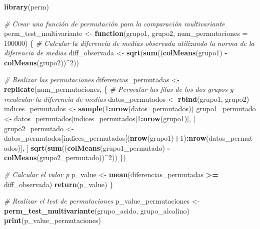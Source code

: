 \documentclass[
]{article}
\newenvironment{Shaded}{\begin{snugshade}}{\end{snugshade}}
\newcommand{\AttributeTok}[1]{\textcolor[rgb]{0.13,0.29,0.53}{#1}}
\newcommand{\CommentTok}[1]{\textcolor[rgb]{0.56,0.35,0.01}{\textit{#1}}}
\newcommand{\ControlFlowTok}[1]{\textcolor[rgb]{0.13,0.29,0.53}{\textbf{#1}}}
\newcommand{\DecValTok}[1]{\textcolor[rgb]{0.00,0.00,0.81}{#1}}
\newcommand{\FunctionTok}[1]{\textcolor[rgb]{0.13,0.29,0.53}{\textbf{#1}}}
\newcommand{\NormalTok}[1]{#1}
\newcommand{\OtherTok}[1]{\textcolor[rgb]{0.56,0.35,0.01}{#1}}
\newcommand{\SpecialCharTok}[1]{\textcolor[rgb]{0.81,0.36,0.00}{\textbf{#1}}}
\begin{document}
\begin{Shaded}
\begin{Highlighting}[]
\FunctionTok{library}\NormalTok{(perm)}

\CommentTok{\# Crear una función de permutación para la comparación multivariante}
\NormalTok{perm\_test\_multivariante }\OtherTok{\textless{}{-}} \ControlFlowTok{function}\NormalTok{(grupo1, grupo2, }\AttributeTok{num\_permutaciones =} \DecValTok{100000}\NormalTok{) \{}
  \CommentTok{\# Calcular la diferencia de medias observada utilizando la norma de la diferencia de medias}
\NormalTok{  diff\_observada }\OtherTok{\textless{}{-}} \FunctionTok{sqrt}\NormalTok{(}\FunctionTok{sum}\NormalTok{((}\FunctionTok{colMeans}\NormalTok{(grupo1) }\SpecialCharTok{{-}} \FunctionTok{colMeans}\NormalTok{(grupo2))}\SpecialCharTok{\^{}}\DecValTok{2}\NormalTok{))}
  
  \CommentTok{\# Realizar las permutaciones}
\NormalTok{  diferencias\_permutadas }\OtherTok{\textless{}{-}} \FunctionTok{replicate}\NormalTok{(num\_permutaciones, \{}
    \CommentTok{\# Permutar las filas de los dos grupos y recalcular la diferencia de medias}
\NormalTok{    datos\_permutados }\OtherTok{\textless{}{-}} \FunctionTok{rbind}\NormalTok{(grupo1, grupo2)}
\NormalTok{    indices\_permutados }\OtherTok{\textless{}{-}} \FunctionTok{sample}\NormalTok{(}\DecValTok{1}\SpecialCharTok{:}\FunctionTok{nrow}\NormalTok{(datos\_permutados))}
\NormalTok{    grupo1\_permutado }\OtherTok{\textless{}{-}}\NormalTok{ datos\_permutados[indices\_permutados[}\DecValTok{1}\SpecialCharTok{:}\FunctionTok{nrow}\NormalTok{(grupo1)], ]}
\NormalTok{    grupo2\_permutado }\OtherTok{\textless{}{-}}\NormalTok{ datos\_permutados[indices\_permutados[(}\FunctionTok{nrow}\NormalTok{(grupo1)}\SpecialCharTok{+}\DecValTok{1}\NormalTok{)}\SpecialCharTok{:}\FunctionTok{nrow}\NormalTok{(datos\_permutados)], ]}
    \FunctionTok{sqrt}\NormalTok{(}\FunctionTok{sum}\NormalTok{((}\FunctionTok{colMeans}\NormalTok{(grupo1\_permutado) }\SpecialCharTok{{-}} \FunctionTok{colMeans}\NormalTok{(grupo2\_permutado))}\SpecialCharTok{\^{}}\DecValTok{2}\NormalTok{))}
\NormalTok{  \})}
  
  \CommentTok{\# Calcular el valor p}
\NormalTok{  p\_value }\OtherTok{\textless{}{-}} \FunctionTok{mean}\NormalTok{(diferencias\_permutadas }\SpecialCharTok{\textgreater{}=}\NormalTok{ diff\_observada)}
  \FunctionTok{return}\NormalTok{(p\_value)}
\NormalTok{\}}

\CommentTok{\# Realizar el test de permutaciones}
\NormalTok{p\_value\_permutaciones }\OtherTok{\textless{}{-}} \FunctionTok{perm\_test\_multivariante}\NormalTok{(grupo\_acido, grupo\_alcalino)}
\FunctionTok{print}\NormalTok{(p\_value\_permutaciones)}
\end{Highlighting}
\end{Shaded}
\end{document}
